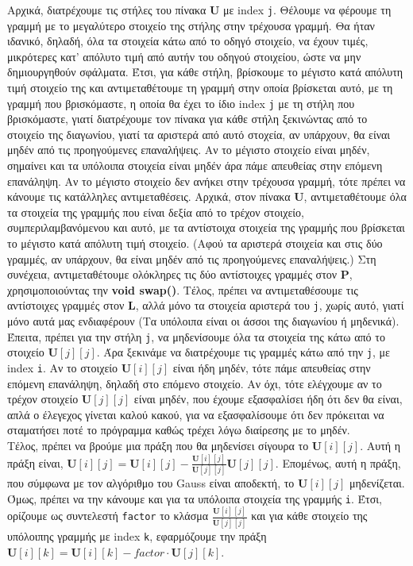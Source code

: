 \documentclass[a4paper, 14pt]{article}   %
\begin{document}
	Αρχικά, διατρέχουμε τις στήλες του πίνακα $\mathbf{U}$ με index \texttt{j}. Θέλουμε να φέρουμε τη γραμμή με το μεγαλύτερο στοιχείο της στήλης στην τρέχουσα γραμμή. Θα ήταν ιδανικό, δηλαδή, όλα τα στοιχεία κάτω από το οδηγό στοιχείο, να έχουν τιμές, μικρότερες κατ’ απόλυτο τιμή από αυτήν του οδηγού στοιχείου, ώστε να μην δημιουργηθούν σφάλματα. Έτσι, για κάθε στήλη, βρίσκουμε το μέγιστο κατά απόλυτη τιμή στοιχείο της και αντιμεταθέτουμε τη γραμμή στην οποία βρίσκεται αυτό, με τη γραμμή που βρισκόμαστε, η οποία θα έχει το ίδιο index \texttt{j} με τη στήλη που βρισκόμαστε, γιατί διατρέχουμε τον πίνακα για κάθε στήλη ξεκινώντας από το στοιχείο της διαγωνίου, γιατί τα αριστερά από αυτό στοχεία, αν υπάρχουν, θα είναι μηδέν από τις προηγούμενες επαναλήψεις. Αν το μέγιστο στοιχείο είναι μηδέν, σημαίνει και τα υπόλοιπα στοιχεία είναι μηδέν άρα πάμε απευθείας στην επόμενη επανάληψη. Αν το μέγιστο στοιχείο δεν ανήκει στην τρέχουσα γραμμή, τότε πρέπει να κάνουμε τις κατάλληλες αντιμεταθέσεις. Αρχικά, στον πίνακα $\mathbf{U}$, αντιμεταθέτουμε όλα τα στοιχεία της γραμμής που είναι δεξία από το τρέχον στοιχείο, συμπεριλαμβανόμενου και αυτό, με τα αντίστοιχα στοιχεία της γραμμής που βρίσκεται το μέγιστο κατά απόλυτη τιμή στοιχείο. (Αφού τα αριστερά στοιχεία και στις δύο γραμμές, αν υπάρχουν, θα είναι μηδέν από τις προηγούμενες επαναλήψεις.) Στη συνέχεια, αντιμεταθέτουμε ολόκληρες τις δύο αντίστοιχες γραμμές στον $\mathbf{P}$, χρησιμοποιούντας την \textbf{void swap()}. Τέλος, πρέπει να αντιμεταθέσουμε τις αντίστοιχες γραμμές στον $\mathbf{L}$, αλλά μόνο τα στοιχεία αριστερά του \texttt{j}, χωρίς αυτό, γιατί μόνο αυτά μας ενδιαφέρουν (Τα υπόλοιπα είναι οι άσσοι της διαγωνίου ή μηδενικά).\\

	Έπειτα, πρέπει για την στήλη \texttt{j}, να μηδενίσουμε όλα τα στοιχεία της κάτω από το στοιχείο $\mathbf{U}[j][j]$. Άρα ξεκινάμε να διατρέχουμε τις γραμμές κάτω από την \texttt{j}, με index \texttt{i}. Αν το στοιχείο $\mathbf{U}[i][j]$ είναι ήδη μηδέν, τότε πάμε απευθείας στην επόμενη επανάληψη, δηλαδή στο επόμενο στοιχείο. Αν όχι, τότε ελέγχουμε αν το τρέχον στοιχείο $\mathbf{U}[j][j]$ είναι μηδέν, που έχουμε εξασφαλίσει ήδη ότι δεν θα είναι, απλά ο έλεγεχος γίνεται καλού κακού, για να εξασφαλίσουμε ότι δεν πρόκειται να σταματήσει ποτέ το πρόγραμμα καθώς τρέχει λόγω διαίρεσης με το μηδέν.\\
	
	Τέλος, πρέπει να βρούμε μια πράξη που θα μηδενίσει σίγουρα το $\mathbf{U}[i][j]$. Αυτή η πράξη είναι, $\mathbf{U}[i][j] = \mathbf{U}[i][j] - \frac{\mathbf{U}[i][j]}{\mathbf{U}[j][j]} \mathbf{U}[j][j]$. Επομένως, αυτή η πράξη, που σύμφωνα με τον αλγόριθμο του Gauss είναι αποδεκτή, το $\mathbf{U}[i][j]$ μηδενίζεται. Όμως, πρέπει να την κάνουμε και για τα υπόλοιπα στοιχεία της γραμμής \texttt{i}. Έτσι, ορίζουμε ως  συντελεστή \texttt{factor} το κλάσμα $\frac{\mathbf{U}[i][j]}{\mathbf{U}[j][j]}$ και για κάθε στοιχείο της υπόλοιπης γραμμής με index \texttt{k}, εφαρμόζουμε την πράξη $\mathbf{U}[i][k] = \mathbf{U}[i][k] - factor \cdot \mathbf{U}[j][k]$.\\
\end{document}
